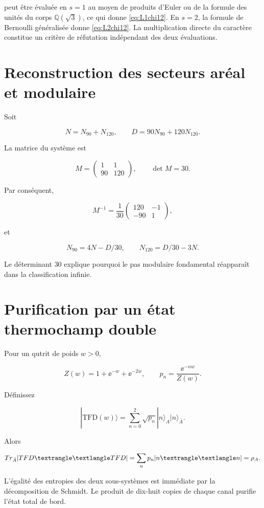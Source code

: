 peut être évaluée en \(s=1\) au moyen de produits d’Euler ou de la formule des unités du corps \(\mathbb Q(\sqrt3)\), ce qui donne \cref{eq:L1chi12}. En \(s=2\), la formule de Bernoulli généralisée donne \cref{eq:L2chi12}. La multiplication directe du caractère constitue un critère de réfutation indépendant des deux évaluations.

\section{Reconstruction des secteurs aréal et modulaire}

Soit

\[
N=N_{90}+N_{120},\qquad D=90N_{90}+120N_{120}.
\]

La matrice du système est

\[
M=\begin{pmatrix}1&1\\90&120\end{pmatrix},
\qquad \det M=30.
\]

Par conséquent,

\[
M^{-1}=\frac1{30}
\begin{pmatrix}120&-1\\-90&1\end{pmatrix},
\]

et

\[
N_{90}=4N-D/30,\qquad N_{120}=D/30-3N.
\]

Le déterminant \(30\) explique pourquoi le pas modulaire fondamental réapparaît dans la classification infinie.

\section{Purification par un état thermochamp double}

Pour un qutrit de poids \(w>0\),

\[
Z(w)=1+\ee^{-w}+\ee^{-2w},
\qquad p_n=\frac{\ee^{-nw}}{Z(w)}.
\]

Définissez

\[
|\mathrm{TFD}(w)\rangle=\sum_{n=0}^2\sqrt{p_n}
|n\rangle_A|n\rangle_{\bar A}.
\]

Alors

\[
\Tr_{\bar A}|\mathrm{TFD}\rangle\langle\mathrm{TFD}|
=\sum_np_n|n\rangle\langle n|=\rho_A.
\]

L’égalité des entropies des deux sous-systèmes est immédiate par la décomposition de Schmidt. Le produit de dix-huit copies de chaque canal purifie l’état total de bord.

